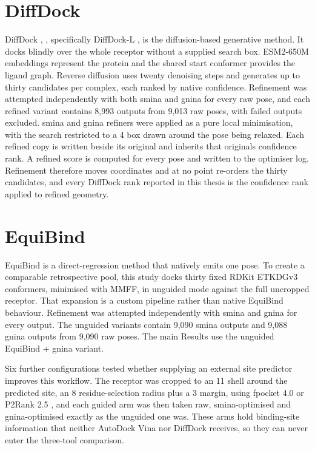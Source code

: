 \hypertarget{diffdock-2}{%
\section{DiffDock}\label{diffdock-2}}

DiffDock \cite{ref024}, \cite{ref008}, specifically DiffDock-L \cite{ref091}, is the diffusion-based generative method. It docks blindly over the whole receptor without a supplied search box. ESM2-650M embeddings represent the protein and the shared start conformer provides the ligand graph. Reverse diffusion uses twenty denoising steps and generates up to thirty candidates per complex, each ranked by native confidence. Refinement was attempted independently with both smina and gnina for every raw pose, and each refined variant contains 8,993 outputs from 9,013 raw poses, with failed outputs excluded. smina and gnina refiners were applied as a pure local minimisation, with the search restricted to a 4\angstrom{} box drawn around the pose being relaxed. Each refined copy is written beside its original and inherits that original\textquotesingle s confidence rank. A refined score is computed for every pose and written to the optimiser log. Refinement therefore moves coordinates and at no point re-orders the thirty candidates, and every DiffDock rank reported in this thesis is the confidence rank applied to refined geometry.

\hypertarget{equibind-2}{%
\section{EquiBind}\label{equibind-2}}

EquiBind \cite{ref010} is a direct-regression method that natively emits one pose. To create a comparable retrospective pool, this study docks thirty fixed RDKit ETKDGv3 conformers, minimised with MMFF, in unguided mode against the full uncropped receptor. That expansion is a custom pipeline rather than native EquiBind behaviour. Refinement was attempted independently with smina and gnina for every output. The unguided variants contain 9,090 smina outputs and 9,088 gnina outputs from 9,090 raw poses. The main Results use the unguided EquiBind + gnina variant. 

Six further configurations tested whether supplying an external site predictor improves this workflow. The receptor was cropped to an 11\angstrom{} shell around the predicted site, an 8\angstrom{} residue-selection radius plus a 3\angstrom{} margin, using fpocket 4.0 \cite{ref060} or P2Rank 2.5 \cite{ref061}, and each guided arm was then taken raw, smina-optimised and gnina-optimised exactly as the unguided one was. These arms hold binding-site information that neither AutoDock Vina nor DiffDock receives, so they can never enter the three-tool comparison.


